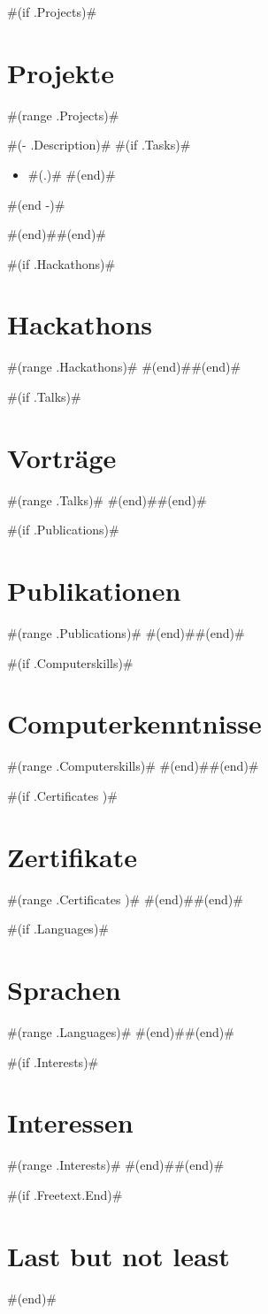 \documentclass[10pt,a4paper,sans]{moderncv}
\begin{document}
#(if .Projects)#\section{Projekte}
#(range .Projects)#
{ #(- .Description)# 
  #(if .Tasks)#\begin{itemize}
    #(range .Tasks)# \item #(.)#
    #(end)#\end{itemize}
  #(end -)# }
#(end)##(end)#

#(if .Hackathons)#\section{Hackathons}
#(range .Hackathons)#
#(end)##(end)#

#(if .Talks)#\section{Vorträge}
#(range .Talks)#
#(end)##(end)#

#(if .Publications)#\section{Publikationen}
#(range .Publications)#
#(end)##(end)#

#(if .Computerskills)#\section{Computerkenntnisse}
#(range .Computerskills)#
#(end)##(end)#

#(if .Certificates )#\section{Zertifikate}
#(range .Certificates )#
#(end)##(end)#

#(if .Languages)#\section{Sprachen}
#(range .Languages)#
#(end)##(end)#

#(if .Interests)#\section{Interessen}
#(range .Interests)#
#(end)##(end)#

#(if .Freetext.End)#\section{Last but not least}
#(end)#
\end{document}
